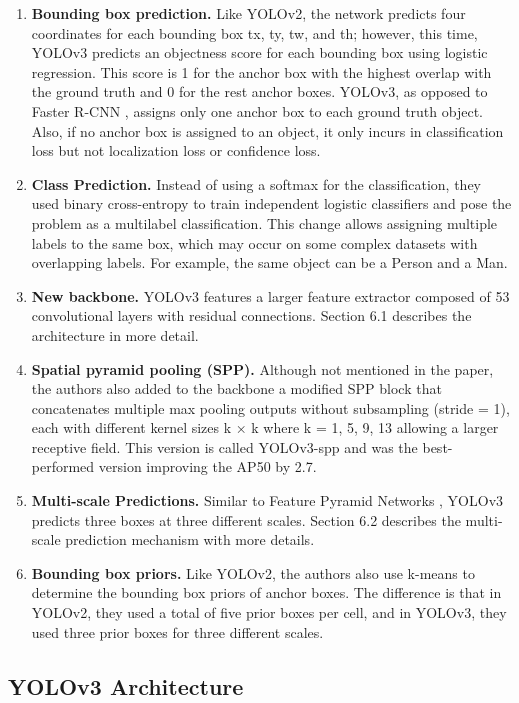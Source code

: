 \documentclass{article}
\begin{document}
\begin{enumerate}
    \item \textbf{Bounding box prediction.} Like YOLOv2, the network predicts four coordinates for each bounding box tx, ty, tw, and th; however, this time, YOLOv3 predicts an objectness score for each bounding box using logistic regression. This score is 1 for the anchor box with the highest overlap with the ground truth and 0 for the rest anchor boxes. YOLOv3, as opposed to Faster R-CNN \cite{faster_RCNN}, assigns only one anchor box to each ground truth object. Also, if no anchor box is assigned to an object, it only incurs in classification loss but not localization loss or confidence loss.
    \item \textbf{Class Prediction.} Instead of using a softmax for the classification, they used binary cross-entropy to train independent logistic classifiers and pose the problem as a multilabel classification. This change allows assigning multiple labels to the same box, which may occur on some complex datasets \cite{krasin2017openimages} with overlapping labels. For example, the same object can be a Person and a Man.
    \item \textbf{New backbone.} YOLOv3 features a larger feature extractor composed of 53 convolutional layers with residual connections. Section 6.1 describes the architecture in more detail.
    \item \textbf{Spatial pyramid pooling (SPP).} Although not mentioned in the paper, the authors also added to the backbone a modified SPP block \cite{he2015spatial} that concatenates multiple max pooling outputs without subsampling (stride = 1), each with different kernel sizes k × k where k = 1, 5, 9, 13 allowing a larger receptive field. This version is called YOLOv3-spp and was the best-performed version improving the AP50 by 2.7.
    \item \textbf{Multi-scale Predictions.} Similar to Feature Pyramid Networks \cite{lin2017feature}, YOLOv3 predicts three boxes at three different scales. Section 6.2 describes the multi-scale prediction mechanism with more details.
    \item \textbf{Bounding box priors.} Like YOLOv2, the authors also use k-means to determine the bounding box priors of anchor boxes. The difference is that in YOLOv2, they used a total of five prior boxes per cell, and in YOLOv3, they used three prior boxes for three different scales.
\end{enumerate}


\subsection{YOLOv3 Architecture}
\end{document}
